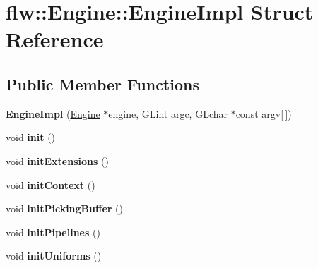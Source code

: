 \hypertarget{structflw_1_1Engine_1_1EngineImpl}{}\section{flw\+:\+:Engine\+:\+:Engine\+Impl Struct Reference}
\label{structflw_1_1Engine_1_1EngineImpl}
\subsection*{Public Member Functions}
\begin{DoxyCompactItemize}
\item 
\mbox{\label{structflw_1_1Engine_1_1EngineImpl_a2858409f491cbadb238bab1935eb086b}} 
{\bfseries Engine\+Impl} (\hyperlink{classflw_1_1Engine}{Engine} $\ast$engine, G\+Lint argc, G\+Lchar $\ast$const argv\mbox{[}$\,$\mbox{]})
\item 
\mbox{\label{structflw_1_1Engine_1_1EngineImpl_a7d4855ffc0f8745ee633b785632b74d8}} 
void {\bfseries init} ()
\item 
\mbox{\label{structflw_1_1Engine_1_1EngineImpl_aaeb903aff35a54f53f87a15bb3b4e25f}} 
void {\bfseries init\+Extensions} ()
\item 
\mbox{\label{structflw_1_1Engine_1_1EngineImpl_a58da927e421b984014838bc1a6884532}} 
void {\bfseries init\+Context} ()
\item 
\mbox{\label{structflw_1_1Engine_1_1EngineImpl_a8578f4bb773044ef9f96a69aeb3a882f}} 
void {\bfseries init\+Picking\+Buffer} ()
\item 
\mbox{\label{structflw_1_1Engine_1_1EngineImpl_abab987d1ab4675fd97512e8f590dc757}} 
void {\bfseries init\+Pipelines} ()
\item 
\mbox{\label{structflw_1_1Engine_1_1EngineImpl_a2411ff33df1ed518721af94d39c613c7}} 
void {\bfseries init\+Uniforms} ()
\item 
\mbox{\label{structflw_1_1Engine_1_1EngineImpl_ad96855d2f982c21d0a7613aa424327bf}} 

\end{DoxyCompactItemize}

